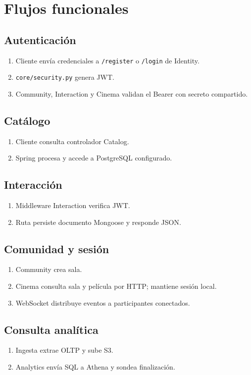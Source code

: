 \chapter{Flujos funcionales}\section{Autenticación}\begin{enumerate}\item Cliente envía credenciales a \texttt{/register} o \texttt{/login} de Identity.\item \texttt{core/security.py} genera JWT.\item Community, Interaction y Cinema validan el Bearer con secreto compartido.\end{enumerate}\section{Catálogo}\begin{enumerate}\item Cliente consulta controlador Catalog.\item Spring procesa y accede a PostgreSQL configurado.\end{enumerate}\section{Interacción}\begin{enumerate}\item Middleware Interaction verifica JWT.\item Ruta persiste documento Mongoose y responde JSON.\end{enumerate}\section{Comunidad y sesión}\begin{enumerate}\item Community crea sala.\item Cinema consulta sala y película por HTTP; mantiene sesión local.\item WebSocket distribuye eventos a participantes conectados.\end{enumerate}\section{Consulta analítica}\begin{enumerate}\item Ingesta extrae OLTP y sube S3.\item Analytics envía SQL a Athena y sondea finalización.\end{enumerate}
